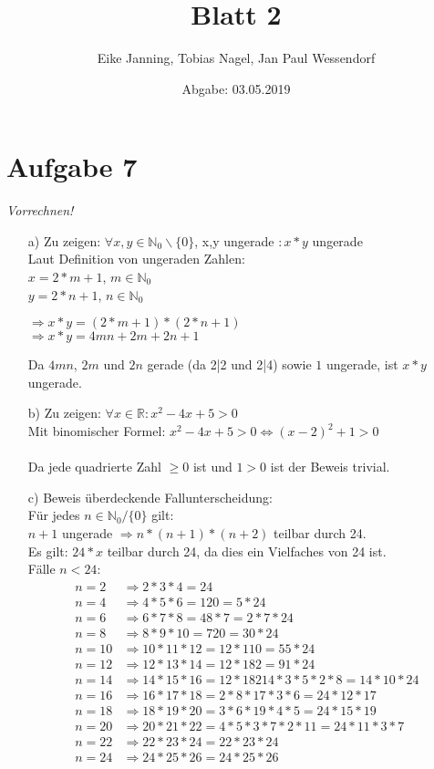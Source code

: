 \documentclass[paper = a4, ngerman]{scrartcl}
\title{Blatt 2}
\author{Eike Janning, Tobias Nagel, Jan Paul Wessendorf}
\date{Abgabe: 03.05.2019}
\begin{document}
	\maketitle
	\hrulefill
	
	\section*{Aufgabe 7}
	\textit{Vorrechnen!}
		\begin{itemize}
			\item[a)] Zu zeigen: $\forall x,y \in \mathbb{N}_0 \backslash \{ 0 \}$, x,y ungerade $: x*y$ ungerade\\
			Laut Definition von ungeraden Zahlen:\\
			$x = 2*m+1$, $m\in \mathbb{N}_0$\\
			$y = 2*n+1$, $n\in \mathbb{N}_0$
			\begin{center}
				$\Rightarrow x*y = (2*m+1)*(2*n+1)$\\
				$\Rightarrow x*y = 4mn + 2m + 2n + 1$
			\end{center}
			Da $4mn$, $2m$ und $2n$ gerade (da 2|2 und 2|4) sowie $1$ ungerade, ist $x*y$ ungerade.
			
			\item[b)] Zu zeigen: $\forall x \in \mathbb{R} : x^2 - 4x + 5 > 0$\\
			Mit binomischer Formel: $x^2 - 4x + 5 > 0 \Leftrightarrow (x - 2)^2 + 1 > 0$\\\\
			Da jede quadrierte Zahl $\ge 0$ ist und $1 > 0$ ist der Beweis trivial.
			
			\item[c)]
			Beweis überdeckende Fallunterscheidung:\\
			Für jedes $n \in \mathbb{N}_0 / \{ 0 \}$ gilt:\\
			$n+1$ ungerade $\Rightarrow n*(n+1)*(n+2)$ teilbar durch 24.\\
			Es gilt: $24*x$ teilbar durch 24, da dies ein Vielfaches von 24 ist.\\
			Fälle $n<24$:
			\begin{align*}
				n=2 &\Rightarrow 2*3*4 = 24\\
				n=4 &\Rightarrow 4*5*6 = 120 = 5*24\\
				n=6 &\Rightarrow 6*7*8 = 48*7 = 2*7*24\\
				n=8 &\Rightarrow 8*9*10 = 720 = 30*24\\
				n=10 &\Rightarrow 10*11*12 = 12*110 = 55*24\\
				n=12 &\Rightarrow 12*13*14 = 12*182 = 91*24\\
				n=14 &\Rightarrow 14*15*16 = 12*18214*3*5*2*8 = 14*10*24\\
				n=16 &\Rightarrow 16*17*18 = 2*8*17*3*6 = 24*12*17\\
				n=18 &\Rightarrow 18*19*20 = 3*6*19*4*5 = 24*15*19\\
				n=20 &\Rightarrow 20*21*22 = 4*5*3*7*2*11 = 24*11*3*7\\
				n=22 &\Rightarrow 22*23*24 = 22*23*24\\
				n=24 &\Rightarrow 24*25*26 = 24*25*26\\
			\end{align*}
			

\end{itemize}
\end{document}
